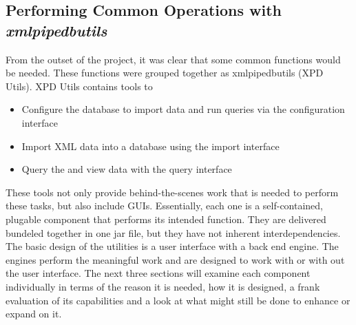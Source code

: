 \subsection{Performing Common Operations with \emph{xmlpipedbutils}}
\label{xmlpipedbutils}
From the outset of the project, it was clear that some common functions would be needed. These functions were grouped together as xmlpipedbutils (XPD Utils). XPD Utils contains tools to 
\begin{itemize}
	\item {Configure the database to import data and run queries via the configuration interface}
	\item {Import XML data into a database using the import interface}
	\item {Query the and view data with the query interface}
\end{itemize}
\par
These tools not only provide behind-the-scenes work that is needed to perform these tasks, but also include GUIs. Essentially, each one is a self-contained, plugable component that performs its intended function. They are delivered bundeled together in one jar file, but they have not inherent interdependencies. 	The basic design of the utilities is a user interface with a back end engine. The engines perform the meaningful work and are designed to work with or with out the user interface. The next three sections will examine each component individually in terms of the reason it is needed, how it is designed, a frank evaluation of its capabilities and a look at what might still be done to enhance or expand on it.

